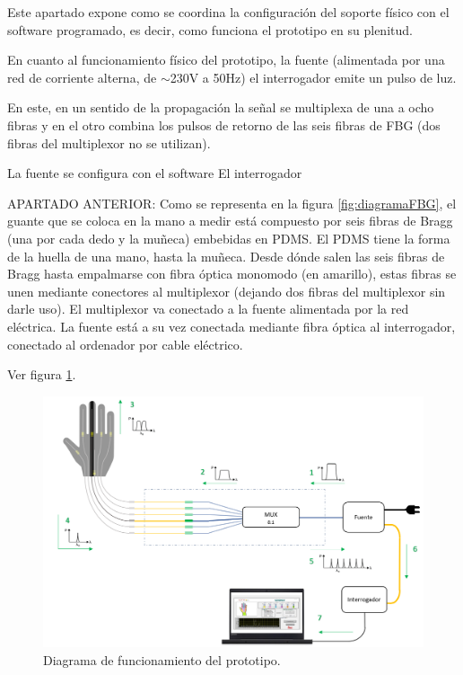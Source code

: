 Este apartado expone como se coordina la configuración del soporte físico con el software programado, es decir, como funciona el prototipo en su plenitud.

En cuanto al funcionamiento físico del prototipo, la fuente  (alimentada por una red de corriente alterna, de $\sim$230V a 50Hz) el interrogador emite un pulso de luz. 



En este, en un sentido de la propagación la señal se multiplexa de una a ocho fibras y en el otro combina los pulsos de retorno de las seis fibras de FBG (dos fibras del multiplexor no se utilizan). 

La fuente se configura con el software 
El interrogador


APARTADO ANTERIOR: 	Como se representa en la figura \ref{fig:diagramaFBG}, el guante que se coloca en la mano a medir está compuesto por seis fibras de Bragg (una por cada dedo y la muñeca) embebidas en PDMS. El PDMS tiene la forma de la huella de una mano, hasta la muñeca. Desde dónde salen las seis fibras de Bragg hasta empalmarse con fibra óptica monomodo (en amarillo), estas fibras se unen mediante conectores al multiplexor (dejando dos fibras del multiplexor sin darle uso). El multiplexor va conectado a la fuente alimentada por la red eléctrica. La fuente está a su vez conectada mediante fibra óptica al interrogador, conectado al ordenador por cable eléctrico.

Ver figura \ref{fig:diagramaFBGfuncionamiento}.

\begin{figure}[H]
	\centering
	\includegraphics[width=1\textwidth]{./img/diagramaFBGfuncionamiento}
	\caption{Diagrama de funcionamiento del prototipo.} \label{fig:diagramaFBGfuncionamiento}
\end{figure}



